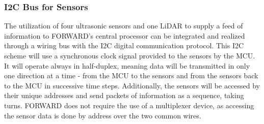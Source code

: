 \subsubsection{I2C Bus for Sensors}
\noindent The utilization of four ultrasonic sensors and one LiDAR to supply a feed of information to FORWARD's central processor can be integrated and realized through a wiring bus with the I2C digital communication protocol. This I2C scheme will use a synchronous clock signal provided to the sensors by the MCU. It will operate always in half-duplex, meaning data will be transmitted in only one direction at a time - from the MCU to the sensors and from the sensors back to the MCU in successive time steps. Additionally, the sensors will be accessed by their unique addresses and send packets of information as a sequence, taking turns. FORWARD does not require the use of a multiplexer device, as accessing the sensor data is done by address over the two common wires.\\